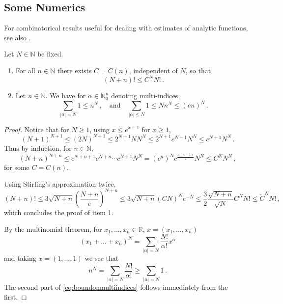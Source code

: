 \documentclass[
	fontsize=11pt, 
	twoside=false, 
	abstract=true, 
	a4paper,
]{scrartcl}
\newcommand{\RR}{\mathbb{R}}
\newcommand{\abs}[1]{\left\lvert#1\right\rvert}
\newcommand{\td}[1]{\tilde{#1}}
\newcommand{\an}{\quad\text{and}\quad}
\begin{document}
\subsection{Some Numerics}

For combinatorical results useful for dealing with estimates of analytic functions, see also \cite[\S~1.2]{doi:10.1142/1550}.
\begin{lemma}\label{lem:morefact}
	Let $N \in \mathbb{N}$ be fixed. 
	\begin{enumerate}
		\item
	For all $n \in \mathbb{N}$ there exists $C = C(n)$, independent of $N$, so that
	\[
		(N+n)! \leq C^N N!\,.
	\]
\item Let $n\in\mathbb{N}$. We have for $\alpha \in \mathbb{N}_0^{n}$ denoting multi-indices,
	\begin{equation}\label{eq:boundonmultiindices}
		\sum_{\abs{\alpha} = N} 1 \leq n^N\,,\an \sum_{\abs{\alpha} \leq N} 1 \leq Nn^{N} \leq (en)^N\,.
	\end{equation}
	\end{enumerate}
\end{lemma}
\begin{proof}
	Notice that for $N \geq 1$, using $x \leq e^{x-1}$ for $x\geq 1$, 
	\[
		(N+1)^{N+1} \leq (2N)^{N+1} \leq 2^{N+1} N N^{N} \leq 2^{N+1}e^{N-1} N^N \leq c^{N+1}N^N\,.
	\]
	Thus by induction, for $n \in \mathbb{N}$,
	\[
		(N+n)^{N+n} \leq c^{N+n+1}c^{N+n}\cdots c^{N+1} N^N = (c^n)^{N} c^{\frac{n(n-1)}{2}} N^N \leq C^N N^N\,,
	\]
	for some $C = C(n)$.

	Using Stirling's approximation twice,
	\[
		(N+n)! \leq 3\sqrt{N+n}\left(\frac{N+n}{e}\right)^{N+n} \leq 3\sqrt{N+n} (CN)^N e^{-N} \leq \frac{3}{2}\frac{\sqrt{N+n}}{\sqrt{N}} C^N N! \leq \td{C}^N N!\,,
	\]
	which concludes the proof of item 1.

	By the multinomial theorem, for $x_1,\dots,x_{n} \in \RR$, $x = (x_1,\dots,x_{n})$
	\[
		(x_1 + \dots + x_{n})^N = \sum_{\abs{\alpha}=N} \frac{N!}{\alpha!} x^\alpha
	\]
	and taking $x = (1,\dots,1)$ we see that
	\[
		n^N = \sum_{\abs{\alpha}=N} \frac{N!}{\alpha!} \geq \sum_{\abs{\alpha}=N} 1\,.
	\]
	The second part of \cref{eq:boundonmultiindices} follows immediately from the first.
\end{proof}
\end{document}
